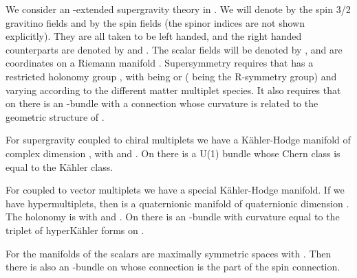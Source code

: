 \documentclass[a4paper,12pt]{article}
\begin{document}
 We consider an \coordHE{}-extended supergravity theory in \coordHE{}. We will denote by \coordHE{} the spin 3/2 gravitino fields and by \coordHE{} the
spin \coordHE{} fields   (the spinor indices are not shown explicitly).
They are all taken to be left handed, and the right handed
counterparts are denoted by \coordHE{} and \coordHE{}. The
scalar fields will be denoted by \coordHE{}, and are coordinates on a
Riemann manifold \coordHE{}. Supersymmetry requires that
\coordHE{}  has a restricted holonomy group \coordHE{},
with \coordHE{} being \coordHE{} or \coordHE{} (\coordHE{} being the
R-symmetry group) and \coordHE{} varying according to the different
matter multiplet species. It also requires that on \coordHE{}
there is an \coordHE{}-bundle with a connection whose curvature  is
related to the geometric structure of  \coordHE{}
\cite{abcdffm}.

For \coordHE{}  supergravity coupled to \coordHE{} chiral multiplets we have a
K\"ahler-Hodge manifold of complex dimension \coordHE{}, with
\coordHE{} and \coordHE{}. On \coordHE{} there is a U(1)
bundle whose Chern class is equal to the K\"ahler class.

For \coordHE{} coupled to \coordHE{} vector multiplets we have a special
K\"ahler-Hodge manifold. If we have \coordHE{}
 hypermultiplets, then \coordHE{} is a quaternionic manifold of quaternionic dimension \coordHE{}. The
holonomy is \coordHE{} with \coordHE{} and
\coordHE{}. On \coordHE{} there is an \coordHE{}-bundle
with curvature equal to the triplet of hyperK\"ahler forms on
\coordHE{}.

For \coordHE{} the manifolds of the scalars are maximally symmetric spaces \coordHE{} with
\coordHE{}. Then there is also an \coordHE{}-bundle on \coordHE{} whose connection is the \coordHE{} part
of the spin connection.
\end{document}
